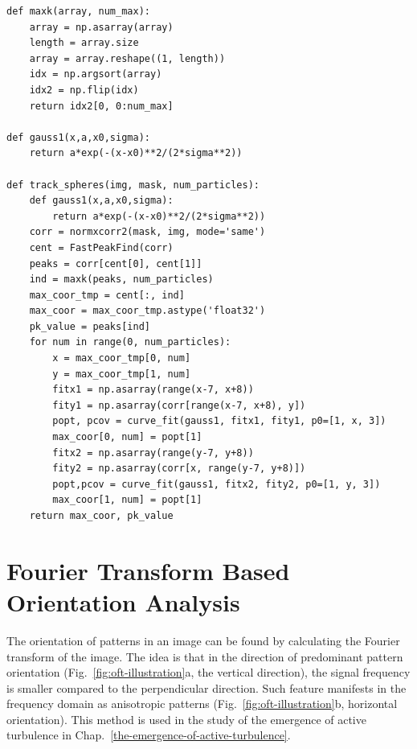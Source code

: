 \begin{verbatim}
def maxk(array, num_max):
    array = np.asarray(array)
    length = array.size
    array = array.reshape((1, length))
    idx = np.argsort(array)
    idx2 = np.flip(idx)
    return idx2[0, 0:num_max]

def gauss1(x,a,x0,sigma):
    return a*exp(-(x-x0)**2/(2*sigma**2))

def track_spheres(img, mask, num_particles):
    def gauss1(x,a,x0,sigma):
        return a*exp(-(x-x0)**2/(2*sigma**2))
    corr = normxcorr2(mask, img, mode='same')
    cent = FastPeakFind(corr)
    peaks = corr[cent[0], cent[1]]
    ind = maxk(peaks, num_particles)
    max_coor_tmp = cent[:, ind]
    max_coor = max_coor_tmp.astype('float32')
    pk_value = peaks[ind]
    for num in range(0, num_particles):
        x = max_coor_tmp[0, num]
        y = max_coor_tmp[1, num]
        fitx1 = np.asarray(range(x-7, x+8))
        fity1 = np.asarray(corr[range(x-7, x+8), y])
        popt, pcov = curve_fit(gauss1, fitx1, fity1, p0=[1, x, 3])
        max_coor[0, num] = popt[1]
        fitx2 = np.asarray(range(y-7, y+8))
        fity2 = np.asarray(corr[x, range(y-7, y+8)])
        popt,pcov = curve_fit(gauss1, fitx2, fity2, p0=[1, y, 3])
        max_coor[1, num] = popt[1]
    return max_coor, pk_value
\end{verbatim}


\section{Fourier Transform Based Orientation Analysis}
\label{fourier-transform-based-orientation-analysis}

The orientation of patterns in an image can be found by calculating the Fourier transform of the image. The idea is that in the direction of predominant pattern orientation (Fig.~\ref{fig:oft-illustration}a, the vertical direction), the signal frequency is smaller compared to the perpendicular direction. Such feature manifests in the frequency domain as anisotropic patterns (Fig.~\ref{fig:oft-illustration}b, horizontal orientation). This method is used in the study of the emergence of active turbulence in Chap.~\ref{the-emergence-of-active-turbulence}.

